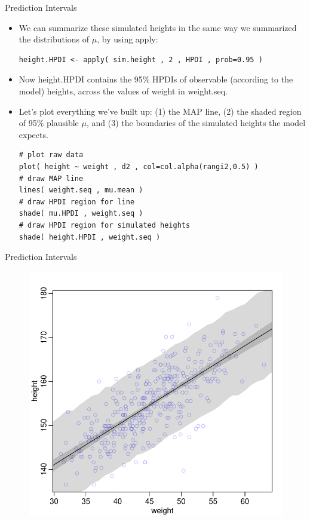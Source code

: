\documentclass[handout]{beamer}
\begin{document}
\begin{frame}[fragile]{Prediction Intervals}
\scriptsize{
\begin{itemize}


\item We can summarize these simulated heights in the same way we summarized the distributions of $\mu$, by using apply:

\begin{verbatim}
height.HPDI <- apply( sim.height , 2 , HPDI , prob=0.95 ) 
\end{verbatim}

\item Now height.HPDI contains the 95\% HPDIs of observable (according to the model) heights, across the values of weight in weight.seq.

\item Let's plot everything we've built up: (1) the MAP line, (2) the shaded region of 95\% plausible $\mu$, and (3) the boundaries of the simulated heights the model expects.

\begin{verbatim}
# plot raw data
plot( height ~ weight , d2 , col=col.alpha(rangi2,0.5) )
# draw MAP line
lines( weight.seq , mu.mean )
# draw HPDI region for line
shade( mu.HPDI , weight.seq )
# draw HPDI region for simulated heights
shade( height.HPDI , weight.seq ) 
\end{verbatim}




\end{itemize}
 

 
}
\end{frame}

\begin{frame}{Prediction Intervals}

\begin{figure}[h!]
	\centering
	\includegraphics[scale=0.55]{pics/sim_height.pdf}
\end{figure}

\end{frame}
\end{document}
